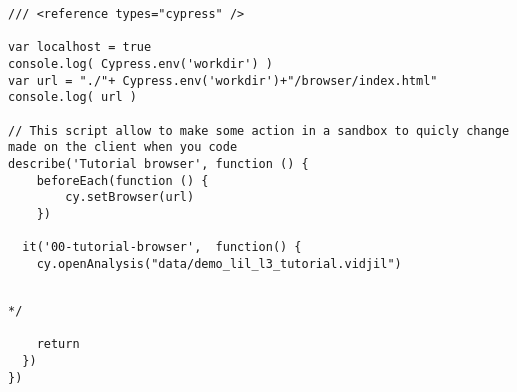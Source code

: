
\begin{verbatim}
/// <reference types="cypress" />

var localhost = true
console.log( Cypress.env('workdir') )
var url = "./"+ Cypress.env('workdir')+"/browser/index.html"
console.log( url )

// This script allow to make some action in a sandbox to quicly change made on the client when you code
describe('Tutorial browser', function () {
    beforeEach(function () {
        cy.setBrowser(url)
    })

  it('00-tutorial-browser',  function() {
    cy.openAnalysis("data/demo_lil_l3_tutorial.vidjil")


\end{verbatim}










\begin{verbatim}
*/

    return
  })
})

\end{verbatim}


